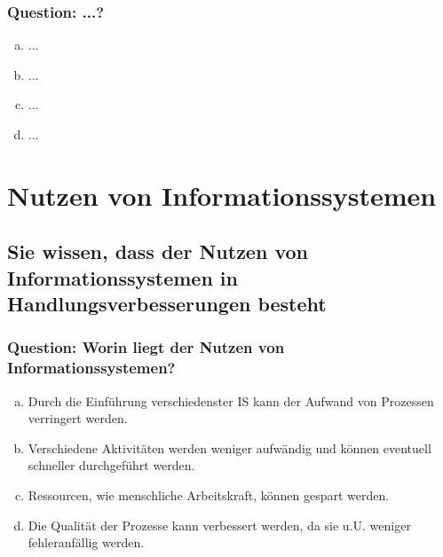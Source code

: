 \documentclass{article}
\begin{document}
\begin{adjustwidth}{2em}{2em}
\begin{adjustwidth}{2em}{2em}
\begin{adjustwidth}{1em}{}
				\subsubsection*{Question: ...?}
				\begin{adjustwidth}{1em}{}
					\begin{enumerate}[(a)]
						\item ...
						\item ...
						\item ...
						\item ...
					\end{enumerate}
				\end{adjustwidth}
			\end{adjustwidth}
		\end{adjustwidth}
		
		\newpage
		
		\section{Nutzen von Informationssystemen}
		\begin{adjustwidth}{2em}{2em}
			\subsection{Sie wissen, dass der Nutzen von Informationssystemen in Handlungsverbesserungen besteht}
			\begin{adjustwidth}{1em}{}
				\subsubsection*{Question: Worin liegt der Nutzen von Informationssystemen?}
				\begin{adjustwidth}{1em}{}
					\begin{enumerate}[(a)]
						\item Durch die Einführung verschiedenster IS kann der Aufwand von Prozessen verringert werden.
						\item Verschiedene Aktivitäten werden weniger aufwändig und können eventuell schneller durchgeführt werden.
						\item Ressourcen, wie menschliche Arbeitskraft, können gespart werden.
						\item Die Qualität der Prozesse kann verbessert werden, da sie u.U. weniger fehleranfällig werden.
					\end{enumerate}
				\end{adjustwidth}
			\end{adjustwidth}

\end{adjustwidth}
\end{adjustwidth}
\end{document}
